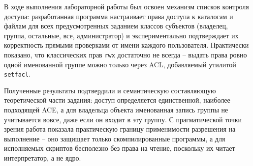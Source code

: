 
\newpage
{}

В ходе выполнения лабораторной работы был освоен механизм списков
контроля доступа: разработанная программа настраивает права доступа к
каталогам и файлам для всех предусмотренных заданием классов субъектов
(владелец, группа, остальные, все, администратор) и экспериментально
подтверждает их корректность прямыми проверками от имени каждого
пользователя. Практически показано, что классических прав \texttt{rwx}
достаточно не всегда -- выдать права ровно одной именованной группе можно
только через ACL, добавляемый утилитой \texttt{setfacl}.

Полученные результаты подтвердили и семантическую составляющую
теоретической части задания: доступ определяется единственной, наиболее
подходящей ACE, а для владельца объекта именованная запись группы не
учитывается вовсе, даже если он входит в эту группу. С прагматической
точки зрения работа показала практическую границу применимости
разрешения на выполнение -- оно защищает только скомпилированные
программы, а для исполняемых скриптов бесполезно без права на чтение,
поскольку их читает интерпретатор, а не ядро.

